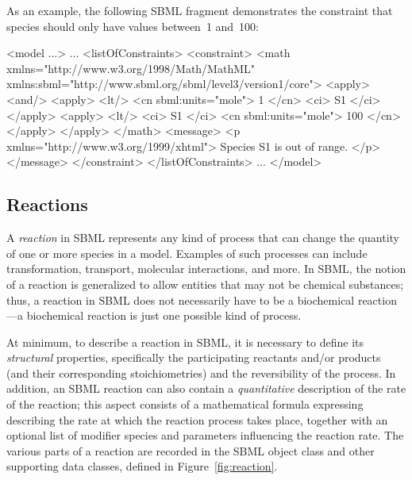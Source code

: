 As an example, the following SBML fragment demonstrates the
constraint that species  should only have values between~1
and~100:

\begin{example}
<model ...>
    ...
    <listOfConstraints>
        <constraint>
            <math xmlns="http://www.w3.org/1998/Math/MathML"
                  xmlns:sbml="http://www.sbml.org/sbml/level3/version1/core">
                <apply>
                    <and/>
                        <apply> 
                          <lt/> 
                          <cn sbml:units="mole"> 1 </cn> 
                          <ci> S1 </ci> 
                        </apply>
                        <apply> 
                          <lt/> 
                          <ci> S1 </ci>  
                          <cn sbml:units="mole"> 100 </cn> 
                        </apply>
                </apply>
            </math>
            <message>
                <p xmlns="http://www.w3.org/1999/xhtml"> Species S1 is out of range. </p>
            </message>
        </constraint>
    </listOfConstraints>
    ...
</model>
\end{example}


\subsection{Reactions}
\label{sec:reactions}

A \emph{reaction} in SBML represents any kind of process that can
change the quantity of one or more species in a model.  Examples
of such processes can include transformation, transport, molecular
interactions, and more.  In SBML, the notion of a reaction is
generalized to allow entities that may not be chemical substances;
thus, a reaction in SBML does not necessarily have to be a
biochemical reaction---a biochemical reaction is just one possible
kind of process.

At minimum, to describe a reaction in SBML, it is necessary to
define its \emph{structural} properties, specifically the
participating reactants and/or products (and their corresponding
stoichiometries) and the reversibility of the process.  In
addition, an SBML reaction can also contain a \emph{quantitative}
description of the rate of the reaction; this aspect consists of a
mathematical formula expressing describing the rate at which the
reaction process takes place, together with an optional list of
modifier species and parameters influencing the reaction rate.
The various parts of a reaction are recorded in the SBML \Reaction
object class and other supporting data classes, defined in
Figure~\vref{fig:reaction}.

